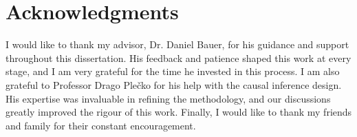 \chapter*{Acknowledgments}

I would like to thank my advisor, Dr. Daniel Bauer, for his guidance and support throughout this dissertation. His feedback and patience shaped this work at every stage, and I am very grateful for the time he invested in this process. I am also grateful to Professor Drago Plečko for his help with the causal inference design. His expertise was invaluable in refining the methodology, and our discussions greatly improved the rigour of this work. Finally, I would like to thank my friends and family for their constant encouragement.
\newpage
